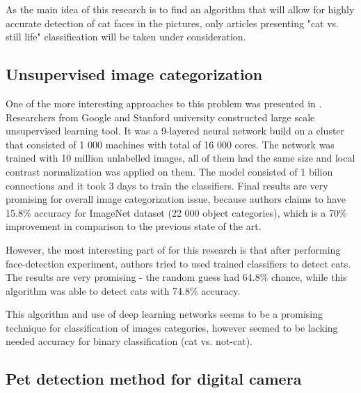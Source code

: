 \documentclass[hyperref]{acmtrans2e}
\begin{document}
As the main idea of this research is to find an algorithm that will allow for highly accurate detection of cat faces in the pictures, only articles presenting "cat vs. still life" classification will be taken under consideration.

\subsection{Unsupervised image categorization}
\label{sec:google}
One of the more interesting approaches to this problem was presented in \cite{google:2012}. Researchers from Google and Stanford university constructed large scale unsupervised learning tool. It was a 9-layered neural network build on a cluster that consisted of 1 000 machines with total of 16 000 cores. The network was trained with 10 million unlabelled images, all of them had the same size and local contrast normalization was applied on them. The model consisted of 1 bilion connections and it took 3 days to train the classifiers. Final results are very promising for overall image categorization issue, because authors claims to have 15.8\% accuracy for ImageNet dataset (22 000 object categories), which is a 70\% improvement in comparison to the previous state of the art. 

However, the most interesting part of \cite{google:2012} for this research is that after performing face-detection experiment, authors tried to used trained classifiers to detect cats. The results are very promising - the random guess had 64.8\% chance, while this algorithm was able to detect cats with 74.8\% accuracy.

This algorithm and use of deep learning networks seems to be a promising technique for classification of images categories, however seemed to be lacking needed accuracy for binary classification (cat vs. not-cat). 
\subsection{Pet detection method for digital camera}
\label{sec:camera}
\end{document}
